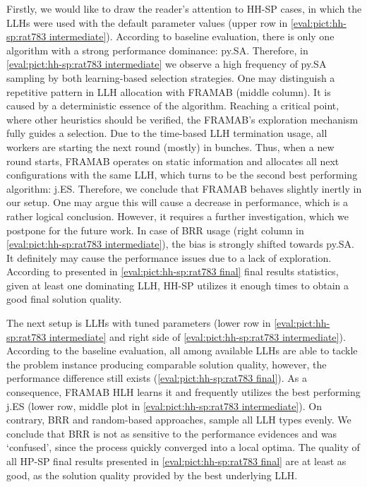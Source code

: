 Firstly, we would like to draw the reader's attention to HH-SP cases, in which the LLHs were used with the default parameter values (upper row in \cref{eval:pict:hh-sp:rat783 intermediate}). According to baseline evaluation, there is only one algorithm with a strong performance dominance: py.SA. Therefore, in \cref{eval:pict:hh-sp:rat783 intermediate} we observe a high frequency of py.SA sampling by both learning-based selection strategies. One may distinguish a repetitive pattern in LLH allocation with FRAMAB (middle column). It is caused by a deterministic essence of the algorithm. Reaching a critical point, where other heuristics should be verified, the FRAMAB's exploration mechanism fully guides a selection. Due to the time-based LLH termination usage, all workers are starting the next round (mostly) in bunches. Thus, when a new round starts, FRAMAB operates on static information and allocates all next configurations with the same LLH, which turns to be the second best performing algorithm: j.ES. Therefore, we conclude that FRAMAB behaves slightly inertly in our setup. One may argue this will cause a decrease in performance, which is a rather logical conclusion. However, it requires a further investigation, which we postpone for the future work. In case of BRR usage (right column in \cref{eval:pict:hh-sp:rat783 intermediate}), the bias is strongly shifted towards py.SA. It definitely may cause the performance issues due to a lack of exploration. According to presented in \cref{eval:pict:hh-sp:rat783 final} final results statistics, given at least one dominating LLH, HH-SP utilizes it enough times to obtain a good final solution quality.

The next setup is LLHs with tuned parameters (lower row in \cref{eval:pict:hh-sp:rat783 intermediate} and right side of \cref{eval:pict:hh-sp:rat783 intermediate}). According to the baseline evaluation, all among available LLHs are able to tackle the problem instance producing comparable solution quality, however, the performance difference still exists (\cref{eval:pict:hh-sp:rat783 final}). As a consequence, FRAMAB HLH learns it and frequently utilizes the best performing j.ES (lower row, middle plot in \cref{eval:pict:hh-sp:rat783 intermediate}). On contrary, BRR and random-based approaches, sample all LLH types evenly. We conclude that BRR is not as sensitive to the performance evidences and was `confused', since the process quickly converged into a local optima. The quality of all HP-SP final results presented in \cref{eval:pict:hh-sp:rat783 final} are at least as good, as the solution quality provided by the best underlying LLH.

